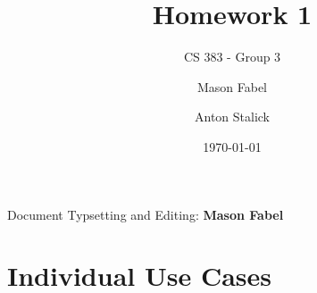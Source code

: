 \documentclass[12pt]{report}
\title{Homework 1}
\subtitle{CS 383 - Group 3}
\author{
Mason Fabel \\
\and Anton Stalick \\
}
\date{\today}
\begin{document}
\maketitle

\tableofcontents
Document Typsetting and Editing: \textbf{Mason Fabel}
\clearpage

\chapter{Individual Use Cases}





\end{document}
